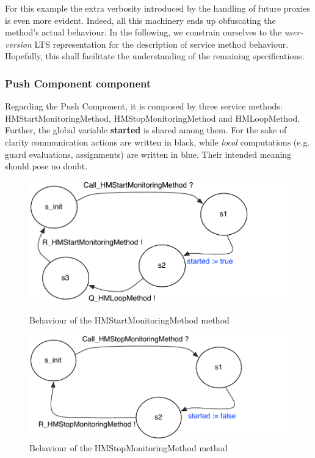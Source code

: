 	
	\noindent For this example the extra verbosity introduced by the handling of future proxies is even
	more evident. Indeed, all this machinery ends up obfuscating the method's actual behaviour.		
	In the following, we constrain ourselves to the \textit{user-version} \ac{LTS} representation for 
	the description of service method behaviour. Hopefully, this shall facilitate the understanding
	of the remaining specifications.		


\subsubsection{\textsf{Push Component} component}	
	
	
	Regarding the \textsf{Push Component}, it is composed by three service methods:  \textsf{HMStartMonitoringMethod},
	\textsf{HMStopMonitoringMethod} and \textsf{HMLoopMethod}. Further, the global variable \textbf{started} is shared
	among them. For the sake of clarity communication actions are 
	written in black, while \textit{local} computations (e.g. guard evaluations, assignments) are written in blue. 
	Their intended meaning should pose no doubt.
	
	   \begin{figure}%
	\centering
	\begin{minipage}[b]{0.45\linewidth} 
	\centering
	\includegraphics[width=\textwidth]{figures/chapter3/HMStartMethod.pdf}
	\caption{Behaviour of the HMStartMonitoringMethod method}
	\label{fig:start}
	\end{minipage}
	\hspace{0.10cm}
	\begin{minipage}[b]{0.45\linewidth} 
	\centering
	\includegraphics[width=\textwidth]{figures/chapter3/HMStopMethod.pdf}
	\caption{Behaviour of the HMStopMonitoringMethod method}
	\label{fig:stop}
	\end{minipage}
	\end{figure}	  
		

